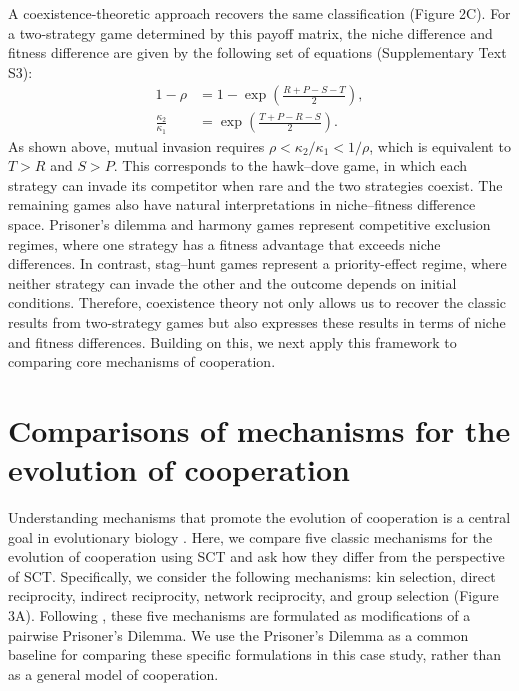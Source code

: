 \documentclass[12pt]{article}
\begin{document}
A coexistence-theoretic approach recovers the same classification (Figure 2C). 
For a two-strategy game determined by this payoff matrix, the niche difference and fitness difference are given by the following set of equations (Supplementary Text S3):
\begin{align}
1- \rho &= 1 - \exp\left(\frac{R + P - S - T}{2}\right),\label{eq:nd}\\
\frac{\kappa_2}{\kappa_1} &= \exp\left(\frac{T+P-R-S}{2}\right)\label{eq:fd}.
\end{align}
As shown above, mutual invasion requires $\rho < \kappa_2/\kappa_1 < 1/\rho$, which is equivalent to $T > R$ and $S > P$.
This corresponds to the hawk--dove game, in which each strategy can invade its competitor when rare and the two strategies coexist. 
The remaining games also have natural interpretations in niche--fitness difference space. 
Prisoner’s dilemma and harmony games represent competitive exclusion regimes, where one strategy has a fitness advantage that exceeds niche differences.
In contrast, stag--hunt games represent a priority-effect regime, where neither strategy can invade the other and the outcome depends on initial conditions.
Therefore, coexistence theory not only allows us to recover the classic results from two-strategy games but also expresses these results in terms of niche and fitness differences.
Building on this, we next apply this framework to comparing core mechanisms of cooperation.

\section*{Comparisons of mechanisms for the evolution of cooperation}

Understanding mechanisms that promote the evolution of cooperation is a central goal in evolutionary biology \citep{west2007evolutionary,fletcher2008simple,clutton2009cooperation,kingma2014group,rakoff2016evolution,hilbe2018evolution,apicella2019evolution,west2021ten,lee2022bacterial,palmer2022bacterial,michel2024evolution}.
Here, we compare five classic mechanisms for the evolution of cooperation using SCT \citep{nowak2006five} and ask how they differ from the perspective of SCT.
Specifically, we consider the following mechanisms: kin selection, direct reciprocity, indirect reciprocity, network reciprocity, and group selection (Figure 3A).
Following \cite{nowak2006five}, these five mechanisms are formulated as modifications of a pairwise Prisoner’s Dilemma.
We use the Prisoner’s Dilemma as a common baseline for comparing these specific formulations in this case study, rather than as a general model of cooperation.
\end{document}
